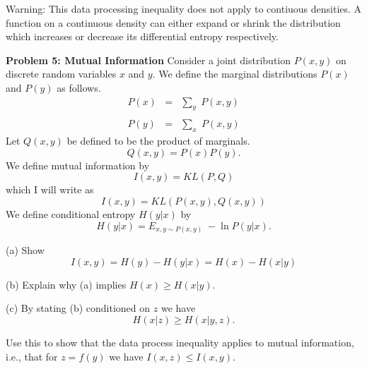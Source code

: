 \documentclass{article}
\newcommand{\solution}[1]{}
\begin{document}
\medskip
Warning: This data processing inequality does not apply to contiuous densities.  A function on a continuous density can either expand or shrink the distribution which
increases or decrease its differential entropy respectively.

\solution{
  \begin{eqnarray*}
    H(y,z) & = & H(y) + H(z|y) = H(y) \\
    & = & H(z) + H(y|z)
  \end{eqnarray*}
  The result now follows from the fact that $H(y|z) \geq 0$
}

\bigskip
{\bf Problem 5: Mutual Information} Consider a joint distribution $P(x,y)$ on discrete random variables $x$ and $y$.
We define the marginal distributions $P(x)$ and $P(y)$ as follows.
\begin{eqnarray*}
  P(x) & = & \sum_y\;P(x,y) \\
  \\
  P(y) & = & \sum_x\;P(x,y)
\end{eqnarray*}
Let $Q(x,y)$ be defined to be the product of marginals.
$$Q(x,y) = P(x)P(y).$$
We define mutual information by
$$I(x,y) = KL(P,Q)$$
which I will write as
$$I(x,y) = KL(P(x,y),Q(x,y))$$
We define conditional entropy $H(y|x)$ by
$$H(y|x) = E_{x,y \sim P(x,y)} \;-\ln P(y|x).$$

(a) Show
$$I(x,y) = H(y) - H(y|x) = H(x) - H(x|y)$$

\solution{
  \begin{eqnarray*}
    I(x,y) & = & E_{x,y \sim P(x,y)}\;\ln \frac{P(x,y)}{P(x)P(y)} \\
    & = & E_{x,y \sim P(x,y)}\;\ln \frac{P(x)P(y|x)}{P(x)P(y)} \\
    & = & E_{x,y \sim P(x,y)}\;\ln \frac{P(y|x)}{P(y)} \\
    & = & \left(E_{y \sim P(y)}\;- \ln P(y) \right) - \left(E_{x,y \sim P(x,y)}\; -\ln P(y|x)\right) \\
    & = & H(y) - H(y|x)
  \end{eqnarray*}
  The other equality is similar.
}

    
    
\bigskip
(b) Explain why (a) implies $H(x) \geq H(x|y)$.

\solution{
  This is because the information $I(x,y)$ is a KL divergence which is always non-negative.
}

\medskip
(c) By stating (b) conditioned on $z$ we have
$$H(x|z) \geq H(x|y,z).$$

Use this to show that the data process inequality applies to mutual information,
i.e., that for $z = f(y)$ we have $I(x,z) \leq I(x,y)$.
\end{document}
